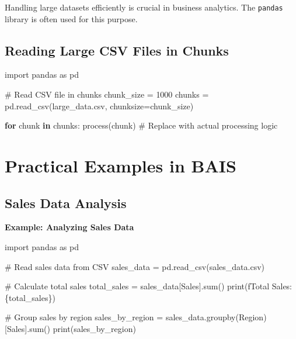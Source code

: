 \documentclass[
  letterpaper,
  DIV=11,
  numbers=noendperiod]{scrreprt}
\newenvironment{Shaded}{\begin{snugshade}}{\end{snugshade}}
\newcommand{\BuiltInTok}[1]{\textcolor[rgb]{0.00,0.23,0.31}{#1}}
\newcommand{\CommentTok}[1]{\textcolor[rgb]{0.37,0.37,0.37}{#1}}
\newcommand{\ControlFlowTok}[1]{\textcolor[rgb]{0.00,0.23,0.31}{\textbf{#1}}}
\newcommand{\DecValTok}[1]{\textcolor[rgb]{0.68,0.00,0.00}{#1}}
\newcommand{\ImportTok}[1]{\textcolor[rgb]{0.00,0.46,0.62}{#1}}
\newcommand{\KeywordTok}[1]{\textcolor[rgb]{0.00,0.23,0.31}{\textbf{#1}}}
\newcommand{\NormalTok}[1]{\textcolor[rgb]{0.00,0.23,0.31}{#1}}
\newcommand{\OperatorTok}[1]{\textcolor[rgb]{0.37,0.37,0.37}{#1}}
\newcommand{\SpecialCharTok}[1]{\textcolor[rgb]{0.37,0.37,0.37}{#1}}
\newcommand{\SpecialStringTok}[1]{\textcolor[rgb]{0.13,0.47,0.30}{#1}}
\newcommand{\StringTok}[1]{\textcolor[rgb]{0.13,0.47,0.30}{#1}}
\begin{document}
Handling large datasets efficiently is crucial in business analytics.
The \texttt{pandas} library is often used for this purpose.

\subsection{Reading Large CSV Files in
Chunks}\label{reading-large-csv-files-in-chunks}

\begin{Shaded}
\begin{Highlighting}[]
\ImportTok{import}\NormalTok{ pandas }\ImportTok{as}\NormalTok{ pd}

\CommentTok{\# Read CSV file in chunks}
\NormalTok{chunk\_size }\OperatorTok{=} \DecValTok{1000}
\NormalTok{chunks }\OperatorTok{=}\NormalTok{ pd.read\_csv(}\StringTok{\textquotesingle{}large\_data.csv\textquotesingle{}}\NormalTok{, chunksize}\OperatorTok{=}\NormalTok{chunk\_size)}

\ControlFlowTok{for}\NormalTok{ chunk }\KeywordTok{in}\NormalTok{ chunks:}
\NormalTok{    process(chunk)  }\CommentTok{\# Replace with actual processing logic}
\end{Highlighting}
\end{Shaded}

\section{Practical Examples in BAIS}\label{practical-examples-in-bais-2}

\subsection{Sales Data Analysis}\label{sales-data-analysis}

\textbf{Example: Analyzing Sales Data}

\begin{Shaded}
\begin{Highlighting}[]
\ImportTok{import}\NormalTok{ pandas }\ImportTok{as}\NormalTok{ pd}

\CommentTok{\# Read sales data from CSV}
\NormalTok{sales\_data }\OperatorTok{=}\NormalTok{ pd.read\_csv(}\StringTok{\textquotesingle{}sales\_data.csv\textquotesingle{}}\NormalTok{)}

\CommentTok{\# Calculate total sales}
\NormalTok{total\_sales }\OperatorTok{=}\NormalTok{ sales\_data[}\StringTok{\textquotesingle{}Sales\textquotesingle{}}\NormalTok{].}\BuiltInTok{sum}\NormalTok{()}
\BuiltInTok{print}\NormalTok{(}\SpecialStringTok{f\textquotesingle{}Total Sales: }\SpecialCharTok{\{}\NormalTok{total\_sales}\SpecialCharTok{\}}\SpecialStringTok{\textquotesingle{}}\NormalTok{)}

\CommentTok{\# Group sales by region}
\NormalTok{sales\_by\_region }\OperatorTok{=}\NormalTok{ sales\_data.groupby(}\StringTok{\textquotesingle{}Region\textquotesingle{}}\NormalTok{)[}\StringTok{\textquotesingle{}Sales\textquotesingle{}}\NormalTok{].}\BuiltInTok{sum}\NormalTok{()}
\BuiltInTok{print}\NormalTok{(sales\_by\_region)}
\end{Highlighting}
\end{Shaded}
\end{document}
